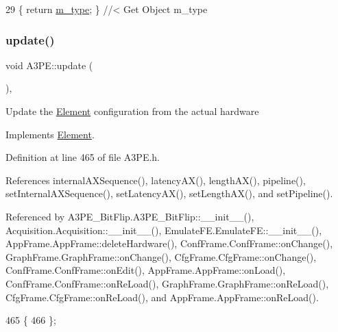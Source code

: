 \begin{DoxyCode}
29 \{ \textcolor{keywordflow}{return} \hyperlink{classObject_a457a600fe8c00eb1034374f75110a78c}{m\_type};       \} \textcolor{comment}{//< Get Object m\_type}
\end{DoxyCode}
\mbox{\label{classA3PE_a9e9b5ba5bd0ee19470c80761269a00f6}} 
\subsubsection{\texorpdfstring{update()}{update()}}
{\footnotesize\ttfamily void A3\+P\+E\+::update (\begin{DoxyParamCaption}{ }\end{DoxyParamCaption})\hspace{0.3cm}{\ttfamily [inline]}, {\ttfamily [virtual]}}

Update the \hyperlink{classElement}{Element} configuration from the actual hardware 

Implements \hyperlink{classElement_a4e6c83efae95616ebddd03c793a26661}{Element}.



Definition at line 465 of file A3\+P\+E.\+h.



References internal\+A\+X\+Sequence(), latency\+A\+X(), length\+A\+X(), pipeline(), set\+Internal\+A\+X\+Sequence(), set\+Latency\+A\+X(), set\+Length\+A\+X(), and set\+Pipeline().



Referenced by A3\+P\+E\+\_\+\+Bit\+Flip.\+A3\+P\+E\+\_\+\+Bit\+Flip\+::\+\_\+\+\_\+init\+\_\+\+\_\+(), Acquisition.\+Acquisition\+::\+\_\+\+\_\+init\+\_\+\+\_\+(), Emulate\+F\+E.\+Emulate\+F\+E\+::\+\_\+\+\_\+init\+\_\+\+\_\+(), App\+Frame.\+App\+Frame\+::delete\+Hardware(), Conf\+Frame.\+Conf\+Frame\+::on\+Change(), Graph\+Frame.\+Graph\+Frame\+::on\+Change(), Cfg\+Frame.\+Cfg\+Frame\+::on\+Change(), Conf\+Frame.\+Conf\+Frame\+::on\+Edit(), App\+Frame.\+App\+Frame\+::on\+Load(), Conf\+Frame.\+Conf\+Frame\+::on\+Re\+Load(), Graph\+Frame.\+Graph\+Frame\+::on\+Re\+Load(), Cfg\+Frame.\+Cfg\+Frame\+::on\+Re\+Load(), and App\+Frame.\+App\+Frame\+::on\+Re\+Load().


\begin{DoxyCode}
465                  \{
466   \};
\end{DoxyCode}
\mbox{\label{classObject_a83d2db2df682907ea1115ad721c1c4a1}} 
